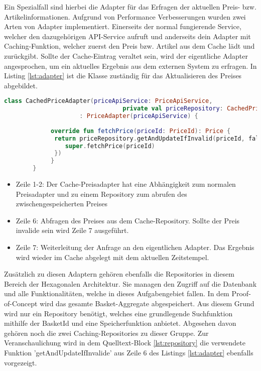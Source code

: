 Ein Spezialfall sind hierbei die Adapter für das Erfragen der aktuellen Preis- bzw. Artikelinformationen. Aufgrund von Performance Verbesserungen wurden zwei Arten von Adapter implementiert. Einerseits der normal fungierende Service, welcher den dazugehörigen API-Service aufruft und anderseits dein Adapter mit Caching-Funktion, welcher zuerst den Preis bzw. Artikel aus dem Cache lädt und zurückgibt. Sollte der Cache-Eintrag veraltet sein, wird der eigentliche Adapter angesprochen, um ein aktuelles Ergebnis aus dem externen System zu erfragen. In Listing \ref{lst:adapter} ist die Klasse zuständig für das Aktualisieren des Preises abgebildet.

\begin{minipage}{\linewidth} %
	\begin{lstlisting}[caption={Preisadapter mit Caching-Funktion}, label={lst:adapter}, language=Kotlin]
		class CachedPriceAdapter(priceApiService: PriceApiService, 
		                         private val priceRepository: CachedPriceRepository)
		             : PriceAdapter(priceApiService) {
			
		     override fun fetchPrice(priceId: PriceId): Price {
		      return priceRepository.getAndUpdateIfInvalid(priceId, fallback = {
			     super.fetchPrice(priceId)
		      })
		     }	
		}
	\end{lstlisting}
\end{minipage}

\begin{itemize}[noitemsep,nolistsep]
	\item Zeile 1-2: Der Cache-Preisadapter hat eine Abhängigkeit zum normalen Preisadapter und zu einem Repository zum abrufen des zwischengespeicherten Preises
	\item Zeile 6: Abfragen des Preises aus dem Cache-Repository. Sollte der Preis invalide sein wird Zeile 7 ausgeführt.
	\item Zeile 7: Weiterleitung der Anfrage an den eigentlichen Adapter. Das Ergebnis wird wieder im Cache abgelegt mit dem aktuellen Zeitstempel.
\end{itemize}

Zusätzlich zu diesen Adaptern gehören ebenfalls die Repositories in diesem Bereich der Hexagonalen Architektur. Sie managen den Zugriff auf die Datenbank und alle Funktionalitäten, welche in dieses Aufgabengebiet fallen. In dem Proof-of-Concept wird das gesamte Basket-Aggregate abgespeichert. Aus diesem Grund wird nur ein Repository benötigt, welches eine grundlegende Suchfunktion mithilfe der BasketId und eine Speicherfunktion anbietet. Abgesehen davon gehören noch die zwei Caching-Repositories zu dieser Gruppe. Zur Veranschaulichung wird in dem Quelltext-Block \ref{lst:repository} die verwendete Funktion 'getAndUpdateIfInvalide' aus Zeile 6 des Listings \ref{lst:adapter} ebenfalls vorgezeigt.

